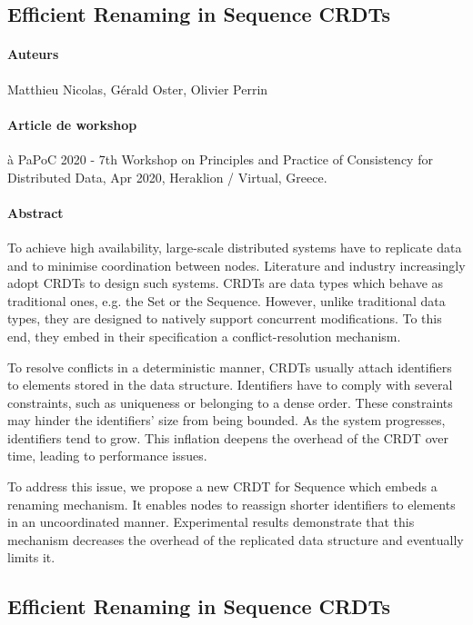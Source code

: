 \subsection*{Efficient Renaming in Sequence CRDTs \cite{2020-rls-papoc-nicolas}}

\paragraph{Auteurs} Matthieu Nicolas, Gérald Oster, Olivier Perrin

\paragraph{Article de workshop} à PaPoC 2020 - 7th Workshop on Principles and Practice of Consistency for Distributed Data, Apr 2020, Heraklion / Virtual, Greece.

\paragraph{Abstract}
To achieve high availability, large-scale distributed systems have to replicate data and to minimise coordination between nodes.
Literature and industry increasingly adopt \acfp{CRDT} to design such systems.
\acp{CRDT} are data types which behave as traditional ones, e.g. the Set or the Sequence.
However, unlike traditional data types, they are designed to natively support concurrent modifications.
To this end, they embed in their specification a conflict-resolution mechanism.

To resolve conflicts in a deterministic manner, \acp{CRDT} usually attach identifiers to elements stored in the data structure.
Identifiers have to comply with several constraints, such as uniqueness or belonging to a dense order.
These constraints may hinder the identifiers’ size from being bounded.
As the system progresses, identifiers tend to grow.
This inflation deepens the overhead of the \ac{CRDT} over time, leading to performance issues.

To address this issue, we propose a new CRDT for Sequence which embeds a renaming mechanism.
It enables nodes to reassign shorter identifiers to elements in an uncoordinated manner.
Experimental results demonstrate that this mechanism decreases the overhead of the replicated data structure and eventually limits it.

\subsection*{Efficient Renaming in Sequence CRDTs \cite{2022-rls-tpds-nicolas}}

